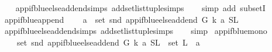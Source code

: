 \begin{isabellebody}
%
\isadelimproof
\ \ %
\endisadelimproof
%
\isatagproof
{}\isamarkupfalse%
\ app{\isacharunderscore}{\kern0pt}if{\isacharunderscore}{\kern0pt}blue{\isacharunderscore}{\kern0pt}else{\isacharunderscore}{\kern0pt}add{\isacharunderscore}{\kern0pt}end{\isachardot}{\kern0pt}simps\ add{\isacharunderscore}{\kern0pt}set{\isacharunderscore}{\kern0pt}list{\isacharunderscore}{\kern0pt}tuple{\isachardot}{\kern0pt}simps\isanewline
\ \ \isamarkupfalse%
\ {\isacharparenleft}{\kern0pt}simp\ add{\isacharcolon}{\kern0pt}\ subsetI{\isacharparenright}{\kern0pt}%
\endisatagproof
{\isafoldproof}%
%
\isadelimproof
\isanewline
%
\endisadelimproof
\isanewline
\isanewline
{}\isamarkupfalse%
\ app{\isacharunderscore}{\kern0pt}if{\isacharunderscore}{\kern0pt}blue{\isacharunderscore}{\kern0pt}append{\isacharcolon}{\kern0pt}\isanewline
\ \ \ \ {\isachardoublequoteopen}a\ {\isasymin}\ set\ {\isacharparenleft}{\kern0pt}snd\ {\isacharparenleft}{\kern0pt}app{\isacharunderscore}{\kern0pt}if{\isacharunderscore}{\kern0pt}blue{\isacharunderscore}{\kern0pt}else{\isacharunderscore}{\kern0pt}add{\isacharunderscore}{\kern0pt}end\ G\ k\ a\ {\isacharparenleft}{\kern0pt}S{\isacharcomma}{\kern0pt}L{\isacharparenright}{\kern0pt}\ {\isacharparenright}{\kern0pt}{\isacharparenright}{\kern0pt}{\isachardoublequoteclose}\isanewline
%
\isadelimproof
\ \ %
\endisadelimproof
%
\isatagproof
{}\isamarkupfalse%
\ app{\isacharunderscore}{\kern0pt}if{\isacharunderscore}{\kern0pt}blue{\isacharunderscore}{\kern0pt}else{\isacharunderscore}{\kern0pt}add{\isacharunderscore}{\kern0pt}end{\isachardot}{\kern0pt}simps\ add{\isacharunderscore}{\kern0pt}set{\isacharunderscore}{\kern0pt}list{\isacharunderscore}{\kern0pt}tuple{\isachardot}{\kern0pt}simps\isanewline
\ \ \isamarkupfalse%
\ simp%
\endisatagproof
{\isafoldproof}%
%
\isadelimproof
\isanewline
%
\endisadelimproof
\isanewline
{}\isamarkupfalse%
\ app{\isacharunderscore}{\kern0pt}if{\isacharunderscore}{\kern0pt}blue{\isacharunderscore}{\kern0pt}mono{}{\isacharcolon}{\kern0pt}\isanewline
\ \ \ \ {\isachardoublequoteopen}set\ {\isacharparenleft}{\kern0pt}snd\ {\isacharparenleft}{\kern0pt}app{\isacharunderscore}{\kern0pt}if{\isacharunderscore}{\kern0pt}blue{\isacharunderscore}{\kern0pt}else{\isacharunderscore}{\kern0pt}add{\isacharunderscore}{\kern0pt}end\ G\ k\ a\ {\isacharparenleft}{\kern0pt}S{\isacharcomma}{\kern0pt}L{\isacharparenright}{\kern0pt}{\isacharparenright}{\kern0pt}{\isacharparenright}{\kern0pt}\ {\isasymsubseteq}\ set\ L\ {\isasymunion}\ {\isacharbraceleft}{\kern0pt}a{\isacharbraceright}{\kern0pt}{\isachardoublequoteclose}\isanewline

\end{isabellebody}
